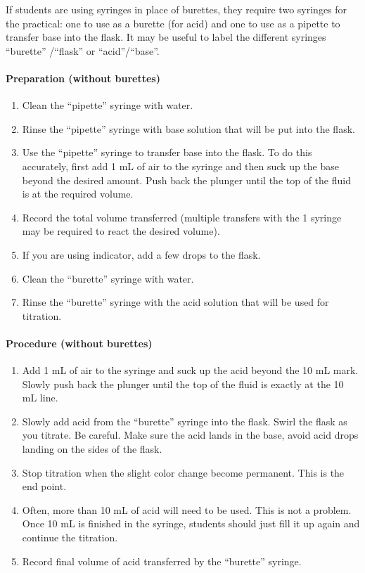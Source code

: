 If students are using syringes in place of burettes, they require two syringes for the practical: one to use as a burette (for acid) and one to use as a pipette to transfer base into the flask.
It may be useful to label the different syringes ``burette'' /``flask'' or ``acid''/``base''.

\paragraph{Preparation (without burettes)}
\begin{enumerate}
\item Clean the ``pipette'' syringe with water.
\item Rinse the ``pipette'' syringe with base solution that will be put into the flask.
\item Use the ``pipette'' syringe to transfer base into the flask. To do this accurately, first add 1 mL of air to the syringe and then suck up the base beyond the desired amount. Push back the plunger until the top of the fluid is at the required volume.
\item Record the total volume transferred (multiple transfers with the 1 syringe may be required to react the desired volume).
\item If you are using indicator, add a few drops to the flask.
\item Clean the ``burette'' syringe with water.
\item Rinse the ``burette'' syringe with the acid solution that will be used for titration.
\end{enumerate}

\paragraph{Procedure (without burettes)}
\begin{enumerate}
\item Add 1 mL of air to the syringe and suck up the acid beyond the 10 mL mark. Slowly push back the plunger until the top of the fluid is exactly at the 10 mL line.
\item Slowly add acid from the ``burette'' syringe into the flask. Swirl the flask as you titrate. Be careful. Make sure the acid lands in the base, avoid acid drops landing on the sides of the flask.
\item Stop titration when the slight color change become permanent. This is the end point.
\item Often, more than 10 mL of acid will need to be used. This is not a problem. Once 10 mL is finished in the syringe, students should just fill it up again and continue the titration.
\item Record final volume of acid transferred by the ``burette'' syringe.
\end{enumerate}

